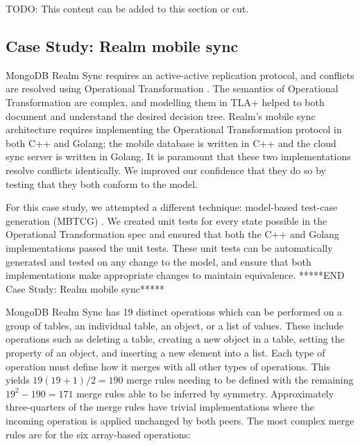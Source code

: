 \documentclass{vldb}
\begin{document}
TODO: This content can be added to this section or cut.
\subsection{Case Study: Realm mobile sync}
MongoDB Realm Sync requires an active-active replication protocol, and conflicts are resolved using Operational Transformation \cite{Stigsen19RealmPatent}.
The semantics of Operational Transformation are complex, and modelling them in TLA+ helped to both document and understand the desired decision tree.
Realm's mobile sync architecture requires implementing the Operational Transformation protocol in both C++ and Golang; the mobile database is written in C++ and the cloud sync server is written in Golang.
It is paramount that these two implementations resolve conflicts identically.
We improved our confidence that they do so by testing that they both conform to the model.

For this case study, we attempted a different technique: model-based test-case generation (MBTCG) \cite{Gravell11ConcurrentDevelopmentOfModelAndImplementation}.
We created unit tests for every state possible in the Operational Transformation spec and ensured that both the C++ and Golang implementations passed the unit tests.
These unit tests can be automatically generated and tested on any change to the model, and ensure that both implementations make appropriate changes to maintain equivalence. 
*****END Case Study: Realm mobile sync*****



MongoDB Realm Sync has 19 distinct operations which can be performed on a group of tables, an individual table, an object, or a list of values. These include operations such as deleting a table, creating a new object in a table, setting the property of an object, and inserting a new element into a list. Each type of operation must define how it merges with all other types of operations. This yields $19 (19 + 1) / 2 = 190$ merge rules needing to be defined with the remaining $19^2 - 190 = 171$ merge rules able to be inferred by symmetry. Approximately three-quarters of the merge rules have trivial implementations where the incoming operation is applied unchanged by both peers. The most complex merge rules are for the six array-based operations:
\end{document}
